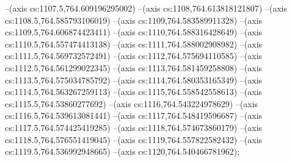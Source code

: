 --(axis cs:1107.5,764.609196295002)
--(axis cs:1108,764.613818121807)
--(axis cs:1108.5,764.585793106019)
--(axis cs:1109,764.583589911328)
--(axis cs:1109.5,764.606874423411)
--(axis cs:1110,764.588316428649)
--(axis cs:1110.5,764.557474413138)
--(axis cs:1111,764.588002908982)
--(axis cs:1111.5,764.569732572491)
--(axis cs:1112,764.575694110585)
--(axis cs:1112.5,764.561299022345)
--(axis cs:1113,764.581459258808)
--(axis cs:1113.5,764.575034785792)
--(axis cs:1114,764.580353165349)
--(axis cs:1114.5,764.563267259113)
--(axis cs:1115,764.558542558613)
--(axis cs:1115.5,764.53860277692)
--(axis cs:1116,764.543224978629)
--(axis cs:1116.5,764.539613081441)
--(axis cs:1117,764.548419596687)
--(axis cs:1117.5,764.574425419285)
--(axis cs:1118,764.574673860179)
--(axis cs:1118.5,764.576551419045)
--(axis cs:1119,764.557822582432)
--(axis cs:1119.5,764.536992948665)
--(axis cs:1120,764.540466781962);
